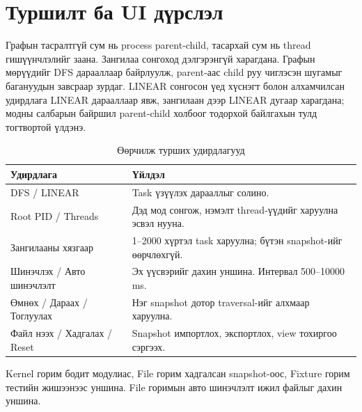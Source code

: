 \section{Туршилт ба UI дүрслэл}
Графын тасралтгүй сум нь process parent-child, тасархай сум нь thread гишүүнчлэлийг заана. Зангилаа сонгоход дэлгэрэнгүй харагдана. Графын мөрүүдийг DFS дарааллаар байрлуулж, parent-аас child руу чиглэсэн шугамыг багануудын завсраар зурдаг. LINEAR сонгосон үед хүснэгт болон алхамчилсан удирдлага LINEAR дарааллаар явж, зангилаан дээр LINEAR дугаар харагдана; модны салбарын байршил parent-child холбоог тодорхой байлгахын тулд тогтвортой үлдэнэ.\par
\begin{table}[H]
\centering\small
\caption{Өөрчилж турших удирдлагууд}
\begin{tabularx}{\textwidth}{|P{3.5cm}|Y|}\hline
{}\textbf{Удирдлага} & \textbf{Үйлдэл} \\\hline
DFS / LINEAR & Task үзүүлэх дарааллыг солино. \\\hline
Root PID / Threads & Дэд мод сонгож, нэмэлт thread-үүдийг харуулна эсвэл нууна. \\\hline
Зангилааны хязгаар & 1--2000 хүртэл task харуулна; бүтэн snapshot-ийг өөрчлөхгүй. \\\hline
Шинэчлэх / Авто шинэчлэлт & Эх үүсвэрийг дахин уншина. Интервал 500--10000 ms. \\\hline
Өмнөх / Дараах / Тоглуулах & Нэг snapshot дотор traversal-ийг алхмаар харуулна. \\\hline
Файл нээх / Хадгалах / Reset & Snapshot импортлох, экспортлох, view тохиргоо сэргээх. \\\hline
\end{tabularx}
\end{table}
Kernel горим бодит модулиас, File горим хадгалсан snapshot-оос, Fixture горим тестийн жишээнээс уншина. File горимын авто шинэчлэлт ижил файлыг дахин уншина.

\clearpage
